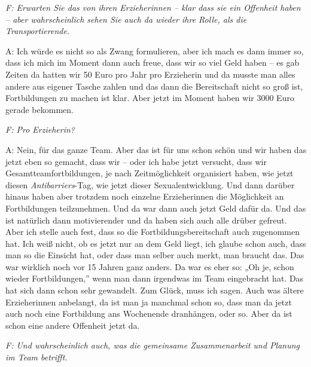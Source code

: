 \emph{F: Erwarten Sie das von ihren Erzieherinnen – klar dass sie ein Offenheit haben – aber wahrscheinlich sehen Sie auch da wieder ihre Rolle, als die Transportierende.}

A: Ich würde es nicht so als Zwang formulieren, aber ich mach es dann immer so, dass ich mich im Moment dann auch freue, dass wir so viel Geld haben – es gab Zeiten da hatten wir 50 Euro pro Jahr pro Erzieherin und da musste man alles andere aus eigener Tasche zahlen und das dann die Bereitschaft nicht so groß ist, Fortbildungen zu machen ist klar. Aber jetzt im Moment haben wir 3000 Euro gerade bekommen.

\emph{F: Pro Erzieherin?}

A: Nein, für das ganze Team. Aber das ist für uns schon schön und wir haben das jetzt eben so gemacht, dass wir – oder ich habe jetzt versucht, dass wir Gesamtteamfortbildungen, je nach Zeitmöglichkeit organisiert haben, wie jetzt diesen \emph{Antibarriers}-Tag, wie jetzt dieser Sexualentwicklung. Und dann darüber hinaus haben aber trotzdem noch einzelne Erzieherinnen die Möglichkeit an Fortbildungen teilzunehmen. Und da war dann auch jetzt Geld dafür da. Und das ist natürlich dann motivierender und da haben sich auch alle drüber gefreut. Aber ich stelle auch fest, dass so die Fortbildungsbereitschaft auch zugenommen hat. Ich weiß nicht, ob es jetzt nur an dem Geld liegt, ich glaube schon auch, dass man so die Einsicht hat, oder dass man selber auch merkt, man braucht das. Das war wirklich noch vor 15 Jahren ganz anders. Da war es eher so: „Oh je, schon wieder Fortbildungen,” wenn man dann irgendwas im Team eingebracht hat. Das hat sich dann schon sehr gewandelt. Zum Glück, muss ich sagen. Auch was ältere Erzieherinnen anbelangt, da ist man ja manchmal schon so, dass man da jetzt auch noch eine Fortbildung ans Wochenende dranhängen, oder so. Aber da ist schon eine andere Offenheit jetzt da.

\emph{F: Und wahrscheinlich auch, was die gemeinsame Zusammenarbeit und Planung im Team betrifft.}

